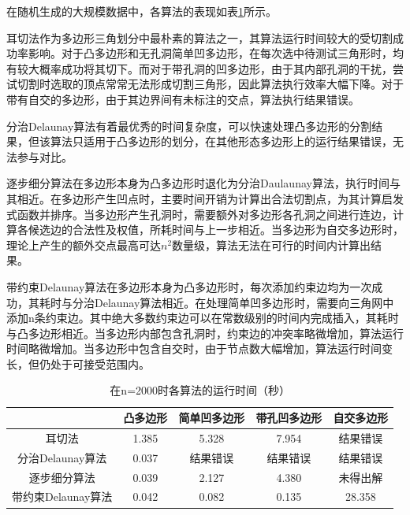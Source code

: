 在随机生成的大规模数据中，各算法的表现如表\ref*{time}所示。

耳切法作为多边形三角划分中最朴素的算法之一，其算法运行时间较大的受切割成功率影响。对于凸多边形和无孔洞简单凹多边形，在每次选中待测试三角形时，均有较大概率成功将其切下。而对于带孔洞的凹多边形，由于其内部孔洞的干扰，尝试切割时选取的顶点常常无法形成切割三角形，因此算法执行效率大幅下降。对于带有自交的多边形，由于其边界间有未标注的交点，算法执行结果错误。

分治Delaunay算法有着最优秀的时间复杂度，可以快速处理凸多边形的分割结果，但该算法只适用于凸多边形的划分，在其他形态多边形上的运行结果错误，无法参与对比。

逐步细分算法在多边形本身为凸多边形时退化为分治Daulaunay算法，执行时间与其相近。在多边形产生凹点时，主要时间开销为计算出合法切割点，为其计算启发式函数并排序。当多边形产生孔洞时，需要额外对多边形各孔洞之间进行连边，计算各候选边的合法性及权值，所耗时间与上一步相近。当多边形为自交多边形时，理论上产生的额外交点最高可达\(n^2\)数量级，算法无法在可行的时间内计算出结果。

带约束Delaunay算法在多边形本身为凸多边形时，每次添加约束边均为一次成功，其耗时与分治Delaunay算法相近。在处理简单凹多边形时，需要向三角网中添加n条约束边。其中绝大多数约束边可以在常数级别的时间内完成插入，其耗时与凸多边形相近。当多边形内部包含孔洞时，约束边的冲突率略微增加，算法运行时间略微增加。当多边形中包含自交时，由于节点数大幅增加，算法运行时间变长，但仍处于可接受范围内。
\begin{table}[htp]
    \centering
    \caption{在n=2000时各算法的运行时间（秒）}
    \label{time}
    \begin{tabular}{ccccc}
    \hline
                           & 凸多边形  & 简单凹多边形 & 带孔凹多边形  & 自交多边形 \\ \hline
    耳切法                    & 1.385 & 5.328  & 7.954       & 结果错误         \\
    分治Delaunay算法           & 0.037 & 结果错误   & 结果错误        & 结果错误         \\
    逐步细分算法          & 0.039 & 2.127  & 4.380       & 未得出解         \\
    带约束Delaunay算法 & 0.042 & 0.082  & 0.135      & 28.358        \\ \hline
    \end{tabular}
\end{table}


